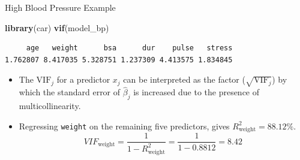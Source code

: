 \documentclass[
  ignorenonframetext,
]{beamer}
\newenvironment{Shaded}{\begin{snugshade}}{\end{snugshade}}
\newcommand{\FunctionTok}[1]{\textcolor[rgb]{0.13,0.29,0.53}{\textbf{#1}}}
\newcommand{\NormalTok}[1]{#1}
\begin{document}
\begin{frame}[fragile]{High Blood Pressure Example}
\label{high-blood-pressure-example-3}
\normalsize

\begin{Shaded}
\begin{Highlighting}[]
\FunctionTok{library}\NormalTok{(car)}
\FunctionTok{vif}\NormalTok{(model\_bp)}
\end{Highlighting}
\end{Shaded}

\begin{verbatim}
     age   weight      bsa      dur    pulse   stress 
1.762807 8.417035 5.328751 1.237309 4.413575 1.834845 
\end{verbatim}

\normalsize

\begin{itemize}
\item
  The \(\text{VIF}_j\) for a predictor \(x_j\) can be interpreted as the
  factor (\(\sqrt{\text{VIF}_j}\)) by which the standard error of
  \(\hat{\beta}_j\) is increased due to the presence of
  multicollinearity.
\item
  Regressing \texttt{weight} on the remaining five predictors, gives
  \(R^2_{\text{weight}}=88.12\%\).
  \[VIF_{\text{weight}}=\frac{1}{1-R^2_{\text{weight}}}=\frac{1}{1-0.8812}=8.42\]
\end{itemize}
\end{frame}
\end{document}
